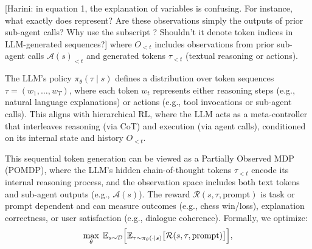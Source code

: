 \documentclass{article}
\newcommand{\harini}[1]{\textcolor{themeharini}{[Harini: #1]}}
\theoremstyle{plain}
\theoremstyle{definition}
\theoremstyle{remark}
\begin{document}
\harini{in equation 1, the explanation of variables is confusing. For instance, what exactly does 
 represent? Are these observations simply the outputs of prior sub-agent calls? Why use the subscript 
? Shouldn't it denote token indices in LLM-generated sequences?}
where \(O_{<t}\) includes observations from prior sub-agent calls \(\mathcal{A}(s)_{<t}\) and generated tokens \(\tau_{<t}\) (textual reasoning or actions).    

The LLM's policy \(\pi_\theta(\tau \mid s)\) defines a distribution over token sequences \(\tau = (w_1, \dots, w_T)\), where each token \(w_t\) represents either reasoning steps (e.g., natural language explanations) or actions (e.g., tool invocations or sub-agent calls). This aligns with hierarchical RL, where the LLM acts as a meta-controller that interleaves reasoning (via CoT) and execution (via agent calls), conditioned on its internal state and history \(O_{<t}\).  

This sequential token generation can be viewed as a Partially Observed MDP (POMDP), where the LLM's hidden chain-of-thought tokens \(\tau_{<t}\) encode its internal reasoning process, and the observation space includes both text tokens and sub-agent outputs (e.g., \(\mathcal{A}(s)\)). The reward \(\mathcal{R}(s, \tau, \text{prompt})\) is task or prompt dependent and can measure outcomes (e.g., chess win/loss), explanation correctness, or user satisfaction (e.g., dialogue coherence). Formally, we optimize:
\vspace{-2mm}
\begin{equation}
\max_\theta \; \mathbb{E}_{s \sim \mathcal{D}} \Bigl[
  \mathbb{E}_{\tau \sim \pi_\theta(\cdot \mid s)} \bigl[\mathcal{R}(s, \tau, \text{prompt})\bigr]
\Bigr],  
\label{eq:llm_agent_objective}
\end{equation}
\end{document}
